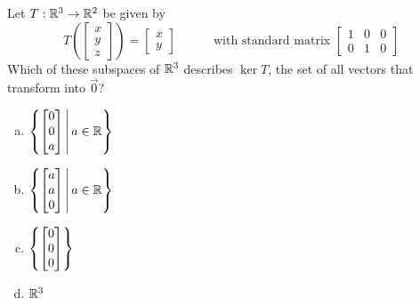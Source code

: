 \begin{applicationActivities}
\begin{activity}{5}
Let $T: \mathbb{R}^3 \rightarrow \mathbb{R}^2$ be given by
\[
  T\left(\begin{bmatrix}x \\ y\\z \end{bmatrix} \right)
    =
  \begin{bmatrix} x \\ y \end{bmatrix}
    \hspace{3em}
    \text{with standard matrix }
  \begin{bmatrix} 1 & 0 & 0 \\ 0 & 1 & 0 \end{bmatrix}
\]
Which of these subspaces of \(\mathbb{R}^3\) describes \(\ker T\),
the set of all vectors that transform into \(\vec 0\)?
\begin{enumerate}[a)]
\item \(\left\{\begin{bmatrix}0 \\ 0\\ a\end{bmatrix}\,\middle|\,a\in\mathbb{R}\right\}\)
\item \(\left\{\begin{bmatrix}a \\ a\\ 0\end{bmatrix}\,\middle|\,a\in\mathbb{R}\right\}\)
\item \(\left\{\begin{bmatrix}0\\0\\0\end{bmatrix}\right\}\)
\item \(\mathbb{R}^3\)
\end{enumerate}
\end{activity}




\end{applicationActivities}
